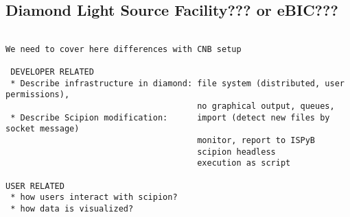 
\subsection{Diamond Light Source Facility??? or eBIC???}

\begin{verbatim}
 
We need to cover here differences with CNB setup

 DEVELOPER RELATED
 * Describe infrastructure in diamond: file system (distributed, user permissions),
                                       no graphical output, queues, 
 * Describe Scipion modification:      import (detect new files by socket message)
                                       monitor, report to ISPyB 
                                       scipion headless
                                       execution as script

USER RELATED
 * how users interact with scipion?
 * how data is visualized?
\end{verbatim}


